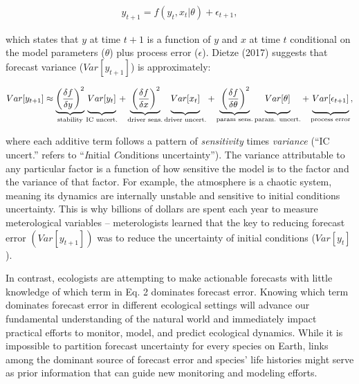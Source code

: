 \documentclass[12pt,]{article}
\begin{document}
\begin{align}
y_{t+1} = f(y_t, x_t|\theta) + \epsilon_{t+1},
\end{align}

\vspace{-0.5em} which states that \(y\) at time \(t+1\) is a function of
\(y\) and \(x\) at time \(t\) conditional on the model parameters
(\(\theta\)) plus process error (\(\epsilon\)). Dietze (2017) suggests
that forecast variance (\(Var[y_{t+1}]\)) is approximately:
\vspace{-1em}

\begin{align}
Var[y_{t+1}] \approx \underbrace{\left(\frac{\delta f}{\delta y} \right)^2}_{\text{stability}} 
               \underbrace{\vphantom{ \left(\frac{\delta f}{\delta y} \right)^2 } Var[y_t]}_{\text{IC uncert.}} +
               \underbrace{\vphantom{ \left(\frac{\delta f}{\delta y} \right)^2 }\left(\frac{\delta f}{\delta x} \right)^2}_{\text{driver sens.}} 
               \underbrace{\vphantom{ \left(\frac{\delta f}{\delta y} \right)^2 } Var[x_t]}_{\text{driver uncert.}} +
               \underbrace{\vphantom{ \left(\frac{\delta f}{\delta y} \right)^2 }\left(\frac{\delta f}{\delta \theta} \right)^2}_{\text{param sens.}}
               \underbrace{\vphantom{ \left(\frac{\delta f}{\delta y} \right)^2 } Var[\theta]}_{\text{param. uncert.}} +
               \underbrace{\vphantom{ \left(\frac{\delta f}{\delta y} \right)^2 } Var[\epsilon_{t+1}]}_{\text{process error}},
\end{align}

where each additive term follows a pattern of \emph{sensitivity} times
\emph{variance} (``IC uncert.'' refers to ``\emph{I}nitial
\emph{C}onditions uncertainty''). The variance attributable to any
particular factor is a function of how sensitive the model is to the
factor and the variance of that factor. For example, the atmosphere is a
chaotic system, meaning its dynamics are internally unstable and
sensitive to initial conditions uncertainty. This is why billions of
dollars are spent each year to measure meterological variables --
meterologists learned that the key to reducing forecast error
\((Var[y_{t+1}])\) was to reduce the uncertainty of initial conditions
(\(Var[y_t]\)).

In contrast, ecologists are attempting to make actionable forecasts with
little knowledge of which term in Eq. 2 dominates forecast error.
Knowing which term dominates forecast error in different ecological
settings will advance our fundamental understanding of the natural world
and immediately impact practical efforts to monitor, model, and predict
ecological dynamics. While it is impossible to partition forecast
uncertainty for every species on Earth, links among the dominant source
of forecast error and species' life histories might serve as prior
information that can guide new monitoring and modeling efforts.
\end{document}
